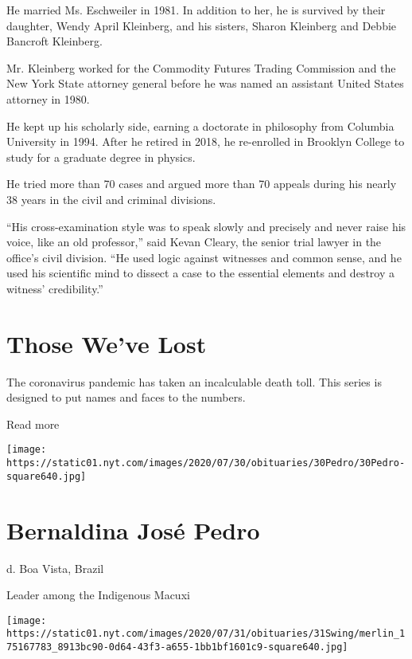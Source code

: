 He married Ms. Eschweiler in 1981. In addition to her, he is survived by
their daughter, Wendy April Kleinberg, and his sisters, Sharon Kleinberg
and Debbie Bancroft Kleinberg.

Mr. Kleinberg worked for the Commodity Futures Trading Commission and
the New York State attorney general before he was named an assistant
United States attorney in 1980.

He kept up his scholarly side, earning a doctorate in philosophy from
Columbia University in 1994. After he retired in 2018, he re-enrolled in
Brooklyn College to study for a graduate degree in physics.

He tried more than 70 cases and argued more than 70 appeals during his
nearly 38 years in the civil and criminal divisions.

``His cross-examination style was to speak slowly and precisely and
never raise his voice, like an old professor,'' said Kevan Cleary, the
senior trial lawyer in the office's civil division. ``He used logic
against witnesses and common sense, and he used his scientific mind to
dissect a case to the essential elements and destroy a witness'
credibility.''

\href{https://www.nytimes.com/interactive/2020/obituaries/people-died-coronavirus-obituaries.html?action=click\&pgtype=Article\&state=default\&region=BELOW_MAIN_CONTENT\&context=covid_obits_promo}{}

\hypertarget{those-weve-lost}{%
\section{Those We've Lost}\label{those-weve-lost}}

The coronavirus pandemic has taken an incalculable death toll. This
series is designed to put names and faces to the numbers.

Read more

\texttt{[image: https://static01.nyt.com/images/2020/07/30/obituaries/30Pedro/30Pedro-square640.jpg]}

\hypertarget{bernaldina-josuxe9-pedro}{%
\section{Bernaldina José Pedro}\label{bernaldina-josuxe9-pedro}}

d. Boa Vista, Brazil

Leader among the Indigenous Macuxi

\texttt{[image: https://static01.nyt.com/images/2020/07/31/obituaries/31Swing/merlin\_175167783\_8913bc90-0d64-43f3-a655-1bb1bf1601c9-square640.jpg]}

